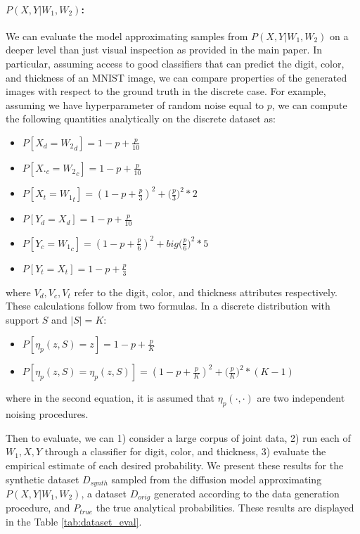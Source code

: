 \documentclass{article}
\theoremstyle{plain}
\theoremstyle{definition}
\theoremstyle{remark}
\begin{document}
	\paragraph{$P(X,Y|W_1, W_2)$:}
	We can evaluate the model approximating samples from $P(X,Y|W_1, W_2)$ on a deeper level than just visual inspection as provided in the main paper. In particular, assuming access to good classifiers that can predict the digit, color, and thickness of an MNIST image, we can compare properties of the generated images with respect to the ground truth in the discrete case. For example, assuming we have hyperparameter of random noise equal to $p$, we can compute the following quantities analytically on the discrete dataset as:
	\begin{itemize}
		\item $P[X_{d} = {W_2}_{d}] = 1-p + \frac{p}{10}$
		\item $P[X._{c} = {W_2}_{c}] = 1-p + \frac{p}{10}$
		\item $P[X_{t}={W_1}_{t}] = (1-p + \frac{p}{3})^2 + \big(\frac{p}{3}\big)^2 * 2$
		\item $P[Y_{d} = X_{d}] = 1-p + \frac{p}{10}$
		\item $P[Y_{c} = {W_1}_{c}] = (1-p + \frac{p}{6})^2 + big(\frac{p}{6}\big)^2 * 5$
		\item $P[Y_{t}=X_{t}] = 1-p + \frac{p}{3}$    
	\end{itemize}
	where $V_d, V_c, V_t$ refer to the digit, color, and thickness attributes respectively.
	These calculations follow from two formulas. In a discrete distribution with support $S$ and $|S|=K$:
	\begin{itemize}
		\item $P[\eta_p(z, S) = z] = 1-p + \frac{p}{K}$
		\item $P[\eta_p(z, S) = \eta_p(z, S)] = (1-p+\frac{p}{K})^2 + \Big(\frac{p}{K}\Big)^2 * (K-1)$
	\end{itemize}
	where in the second equation, it is assumed that $\eta_p(\cdot, \cdot)$ are two independent noising procedures.
	
	Then to evaluate, we can 1) consider a large corpus of joint data, 2) run each of $W_1, X, Y$ through a classifier for digit, color, and thickness, 3) evaluate the empirical estimate of each desired probability. We present these results for the synthetic dataset $D_{synth}$ sampled from the diffusion model approximating $P(X,Y|W_1, W_2)$, a dataset $D_{orig}$ generated according to the data generation procedure, and $P_{true}$ the true analytical probabilities. These results are displayed in the Table \ref{tab:dataset_eval}.
	
\end{document}
